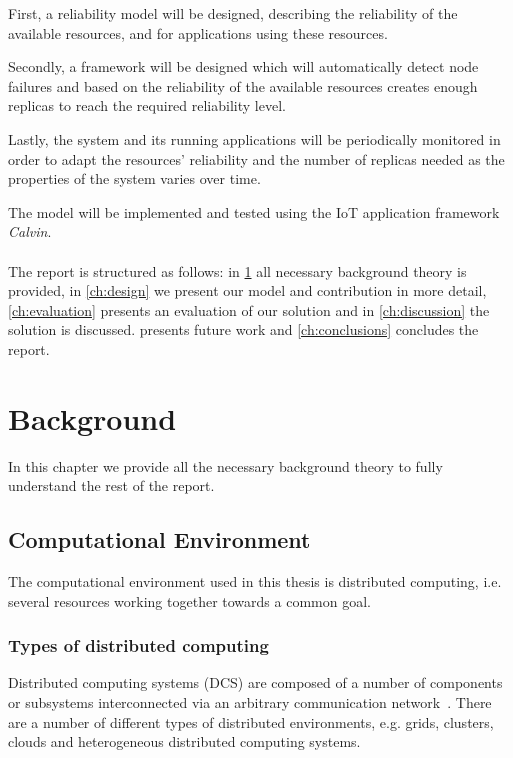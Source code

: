 \documentclass{cslthse-msc}
\begin{document}
First, a reliability model will be designed, describing the reliability of the available resources, and for applications using these resources.

Secondly, a framework will be designed which will automatically detect node failures and based on the reliability of the available resources creates enough replicas to reach the required reliability level.

Lastly, the system and its running applications will be periodically monitored in order to adapt the resources' reliability and the number of replicas needed as the properties of the system varies over time.

The model will be implemented and tested using the IoT application framework \emph{Calvin}.
\\\\
The report is structured as follows: in \cref{ch:background} all necessary background theory is provided, in \cref{ch:design} we present our model and contribution in more detail, \cref{ch:evaluation} presents an evaluation of our solution and in \cref{ch:discussion} the solution is discussed.  presents future work and \cref{ch:conclusions} concludes the report.

\chapter{Background} \label{ch:background}
In this chapter we provide all the necessary background theory to fully understand the rest of the report.
\section{Computational Environment} \label{sec:background_comp_env}
The computational environment used in this thesis is distributed computing, i.e. several resources working together towards a common goal.

\subsection{Types of distributed computing} \label{subsec:background_types_of_distr_comp}
Distributed computing systems (DCS) are composed of a number of components or subsystems interconnected via an arbitrary communication network~\cite{relModelDistSimSystem, efficientRelAnalysisAlgo}. There are a number of different types of distributed environments, e.g. grids, clusters, clouds and heterogeneous distributed computing systems.
\end{document}
